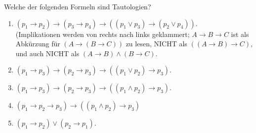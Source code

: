 
\begin{exercise}[21]

Welche der folgenden Formeln sind Tautologien?

\begin{enumerate}[label = \alph*.]
    \item $(p_1 \to p_2) \to (p_3 \to p_4) \to ((p_1 \lor p_3) \to (p_2 \lor p_4))$. \\
    (Implikationen werden von rechts nach links geklammert;
    $A \to B \to C$ ist als Abkürzung für $(A \to (B \to C))$ zu lesen, NICHT als $((A \to B) \to C)$, und auch NICHT als $(A \to B) \land (B \to C)$.
    \item $(p_1 \to p_3) \to (p_2 \to p_3) \to ((p_1 \lor p_2) \to p_3)$.
    \item $(p_1 \to p_3) \to (p_2 \to p_3) \to ((p_1 \land p_2) \to p_3)$.
    \item $(p_1 \to p_2 \to p_3) \to ((p_1 \land p_2) \to p_3)$
    \item $(p_1 \to p_2) \lor (p_2 \to p_1)$.
\end{enumerate}

\end{exercise}


